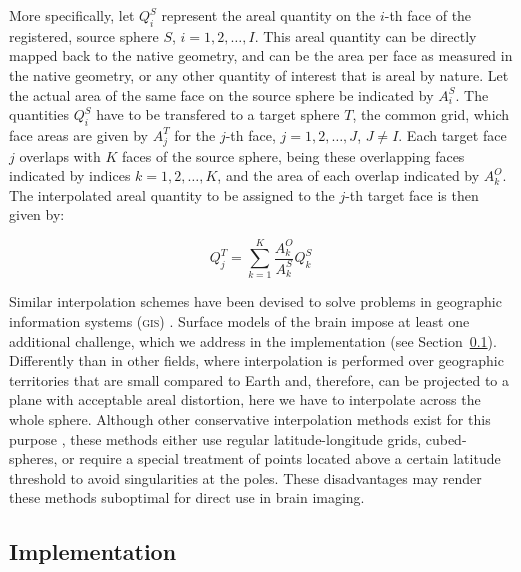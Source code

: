 More specifically, let $Q^{S}_{i}$ represent the areal quantity on the $i$-th face of the registered, source sphere $S$, $i=1,2,\ldots,I$. This areal quantity can be directly mapped back to the native geometry, and can be the area per face as measured in the native geometry, or any other quantity of interest that is areal by nature. Let the actual area of the same face on the source sphere be indicated by $A^{S}_{i}$. The quantities $Q^{S}_{i}$ have to be transfered to a target sphere $T$, the common grid, which face areas are given by $A^{T}_{j}$ for the $j$-th face, $j=1,2,\ldots,J$, $J \neq I$. Each target face $j$ overlaps with $K$ faces of the source sphere, being these overlapping faces indicated by indices $k=1,2,\ldots,K$, and the area of each overlap indicated by $A^{O}_{k}$. The interpolated areal quantity to be assigned to the $j$-th target face is then given by:

\begin{equation}
Q^{T}_{j} = \sum_{k=1}^{K} \frac{A^{O}_{k}}{A^{S}_{k}} Q^{S}_{k}
\end{equation}

Similar interpolation schemes have been devised to solve problems in geographic information systems (\textsc{gis}) \citep{Markoff1973, Goodchild1980, Flowerdew1991, Gregory2010}. Surface models of the brain impose at least one additional challenge, which we address in the implementation (see Section~\ref{sec:areal:implementation}). Differently than in other fields, where interpolation is performed over geographic territories that are small compared to Earth and, therefore, can be projected to a plane with acceptable areal distortion, here we have to interpolate across the whole sphere. Although other conservative interpolation methods exist for this purpose \citep{Jones1999, Lauritzen2008, Ullrich2009}, these methods either use regular latitude-longitude grids, cubed-spheres, or require a special treatment of points located above a certain latitude threshold to avoid singularities at the poles. These disadvantages may render these methods suboptimal for direct use in brain imaging.

\subsection{Implementation}
\label{sec:areal:implementation}

